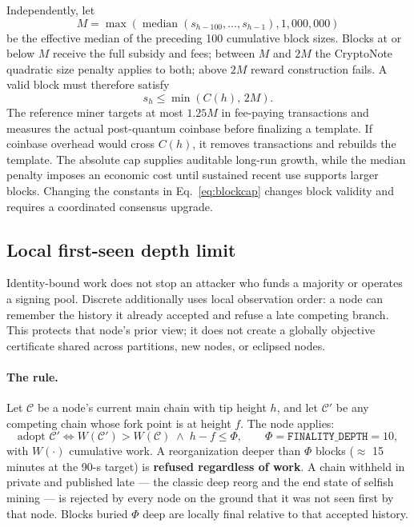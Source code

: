 \documentclass[11pt,a4paper]{article}
\begin{document}
Independently, let
\begin{equation}
M = \max\!\left(\operatorname{median}(s_{h-100},\ldots,s_{h-1}),
1{,}000{,}000\right)
\end{equation}
be the effective median of the preceding 100 cumulative block sizes. Blocks
at or below $M$ receive the full subsidy and fees; between $M$ and $2M$ the
CryptoNote quadratic size penalty applies to both; above $2M$ reward
construction fails. A valid block must therefore satisfy
\begin{equation}
s_h \le \min(C(h),\,2M).
\end{equation}
The reference miner targets at most $1.25M$ in fee-paying transactions and
measures the actual post-quantum coinbase before finalizing a template. If
coinbase overhead would cross $C(h)$, it removes transactions and rebuilds the
template. The absolute cap supplies auditable long-run growth, while the
median penalty imposes an economic cost until sustained recent use supports
larger blocks. Changing the constants in Eq.~\eqref{eq:blockcap} changes block
validity and requires a coordinated consensus upgrade.

\subsection{Local first-seen depth limit}\label{sec:finality}

Identity-bound work does not stop an attacker who funds a majority or operates
a signing pool. Discrete additionally uses local observation order: a node can
remember the history it already accepted and refuse a late competing branch.
This protects that node's prior view; it does not create a globally objective
certificate shared across partitions, new nodes, or eclipsed nodes.

\paragraph{The rule.} Let $\mathcal{C}$ be a node's current main chain with
tip height $h$, and let $\mathcal{C}'$ be any competing chain whose fork
point is at height $f$. The node applies:
\begin{equation}
\text{adopt } \mathcal{C}' \iff
W(\mathcal{C}') > W(\mathcal{C})
\;\wedge\;
h - f \le \Phi,
\qquad \Phi = \mathtt{FINALITY\_DEPTH} = 10,
\end{equation}
with $W(\cdot)$ cumulative work. A reorganization deeper than $\Phi$ blocks
($\approx$ 15 minutes at the 90-s target) is \textbf{refused regardless of
work}. A chain withheld in private and published late --- the classic deep
reorg and the end state of selfish mining --- is rejected by every node on the
ground that it was not seen first by that node. Blocks buried $\Phi$ deep are
locally final relative to that accepted history.
\end{document}
